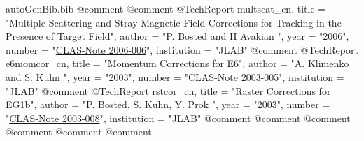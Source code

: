 \begin{filecontents*}{autoGenBib.bib}
@comment %
@comment %
@TechReport{ multscat_cn,
	title = "Multiple Scattering and Stray Magnetic Field Corrections for Tracking in the Presence of Target Field",
	author = "{P. Bosted and H Avakian }",
	year = "2006",
	number = "\href{https://misportal.jlab.org/ul/physics/hall-b/clas/viewFile.cfm/2006-006.pdf?documentId=260}{CLAS-Note 2006-006}",
	institution = "JLAB"
} 
@comment %
@TechReport{ e6momcor_cn,
	title = "{Momentum Corrections for E6}",
	author = "{A. Klimenko and S. Kuhn }",
	year = "2003",
	number = "\href{http://www.jlab.org/Hall-B/notes/clas_notes03/03-005.pdf}{CLAS-Note 2003-005}",
	institution = "JLAB"
}
@comment %
@TechReport{ rstcor_cn,
	title = "Raster Corrections for EG1b",
	author = "{P. Bosted, S. Kuhn, Y. Prok }",
	year = "2003",
	number = "\href{http://www.jlab.org/Hall-B/notes/clas_notes03/03-008.pdf}{CLAS-Note 2003-008}",
	institution = "JLAB"
}
@comment %
@comment %
@comment %
@comment %
@comment %
@comment %



\end{filecontents*}
